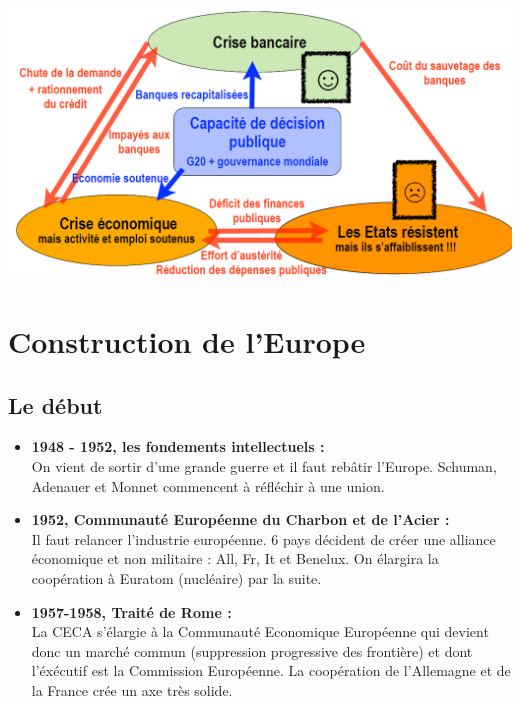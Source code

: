 \ \\
\begin{center}
	\includegraphics[scale=0.3]{29}
\end{center}

\section{Construction de l'Europe}
\subsection{Le début}

\begin{itemize}
	\item \textbf{1948 - 1952, les fondements intellectuels :} \\ 
	      On vient de sortir d'une grande guerre et il faut rebâtir l'Europe. Schuman, Adenauer et Monnet commencent à réfléchir à une union.
	      	
	\item \textbf{1952, Communauté Européenne du Charbon et de l'Acier :} \\
	      Il faut relancer l'industrie européenne. 6 pays décident de créer une alliance économique et non militaire : All, Fr, It et Benelux. On élargira la coopération à Euratom (nucléaire) par la suite.
	      	
	\item \textbf{1957-1958, Traité de Rome :} \\
	      La CECA s'élargie à la Communauté Economique Européenne qui devient donc un marché commun (suppression progressive des frontière) et dont l'éxécutif est la Commission Européenne. La coopération de l'Allemagne et de la France crée un axe très solide. 
\end{itemize}

